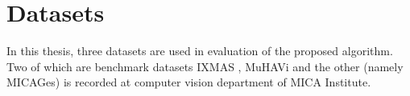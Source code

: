 
\section{Datasets}

    In this thesis, three datasets are used in evaluation of the proposed algorithm. Two of which are benchmark datasets IXMAS \cite{weinland2006free}, MuHAVi \cite{murtaza2016multi} and the other (namely MICAGes) is recorded at computer vision department of MICA Institute. 

    
    
    

